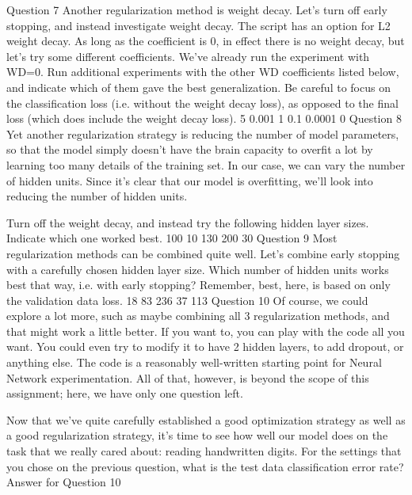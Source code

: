 Question 7
Another regularization method is weight decay. Let's turn off early stopping, and instead investigate weight decay. The script has an option for L2 weight decay. As long as the coefficient is 0, in effect there is no weight decay, but let's try some different coefficients.
We've already run the experiment with WD=0. Run additional experiments with the other WD coefficients listed below, and indicate which of them gave the best generalization. Be careful to focus on the classification loss (i.e. without the weight decay loss), as opposed to the final loss (which does include the weight decay loss).
5
0.001
1
0.1
0.0001
0
Question 8
Yet another regularization strategy is reducing the number of model parameters, so that the model simply doesn't have the brain capacity to overfit a lot by learning too many details of the training set. In our case, we can vary the number of hidden units. Since it's clear that our model is overfitting, we'll look into reducing the number of hidden units.

Turn off the weight decay, and instead try the following hidden layer sizes. Indicate which one worked best.
100
10
130
200
30
Question 9
Most regularization methods can be combined quite well. Let's combine early stopping with a carefully chosen hidden layer size. Which number of hidden units works best that way, i.e. with early stopping? Remember, best, here, is based on only the validation data loss.
18
83
236
37
113
Question 10
Of course, we could explore a lot more, such as maybe combining all 3 regularization methods, and that might work a little better. If you want to, you can play with the code all you want. You could even try to modify it to have 2 hidden layers, to add dropout, or anything else. The code is a reasonably well-written starting point for Neural Network experimentation. All of that, however, is beyond the scope of this assignment; here, we have only one question left.

Now that we've quite carefully established a good optimization strategy as well as a good regularization strategy, it's time to see how well our model does on the task that we really cared about: reading handwritten digits.
For the settings that you chose on the previous question, what is the test data classification error rate?
Answer for Question 10
